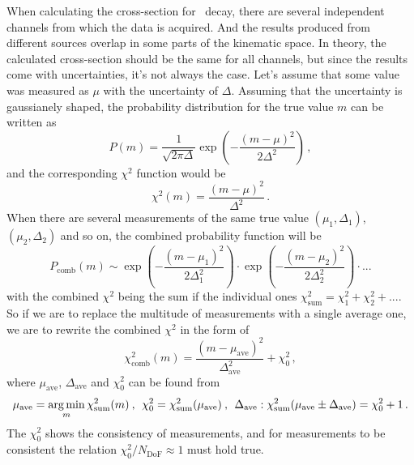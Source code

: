 When calculating the cross-section for \Zll\ decay, there are several independent channels from which the data is acquired. And the results produced from different sources overlap in some parts of the kinematic space. In theory, the calculated cross-section should be the same for all channels, but since the results come with uncertainties, it's not always the case. Let's assume that some value was measured as $\mu$ with the uncertainty of $\Delta$. Assuming that the uncertainty is gaussianely shaped, the probability distribution for the true value $m$ can be written as
\begin{equation}
P(m) = \frac{1}{\sqrt{2\pi\Delta}}\exp\left(-\frac{(m-\mu)^2}{2\Delta^2}\right) \,,
\end{equation}
and the corresponding $\chi^2$ function would be
\begin{equation}
\chi^2(m) = \frac{(m-\mu)^2}{\Delta^2} \,.
\end{equation}
When there are several measurements of the same true value $(\mu_1, \Delta_1)$, $(\mu_2, \Delta_2)$ and so on, the combined probability function will be
\begin{equation}
P_\mathrm{comb}(m) \sim \exp\left(-\frac{(m-\mu_1)^2}{2\Delta_1^2}\right) \cdot \exp\left(-\frac{(m-\mu_2)^2}{2\Delta_2^2}\right) \cdot ...
\end{equation}
with the combined $\chi^2$ being the sum if the individual ones $\chi^2_\mathrm{sum} = \chi^2_1 + \chi^2_2 + ...$. So if we are to replace the multitude of measurements with a single average one, we are to rewrite the combined $\chi^2$ in the form of
\begin{equation}
\chi^2_\mathrm{comb}(m) = \frac{(m-\mu_\mathrm{ave})^2}{\Delta_\mathrm{ave}^2} + \chi^2_0\,,
\end{equation}
where $\mu_\mathrm{ave}$, $\Delta_\mathrm{ave}$ and $\chi^2_0$ can be found from
\begin{equation}
\mu_\mathrm{ave} = \operatorname*{arg\,min}_m \chi^2_\mathrm{sum}(m) \:,\:\: \chi^2_0 = \chi^2_\mathrm{sum}(\mu_\mathrm{ave}) \:,\:\:\Delta_\mathrm{ave}: \chi^2_\mathrm{sum}(\mu_\mathrm{ave}\pm\Delta_\mathrm{ave})=\chi^2_0+1 \,.
\end{equation}
The $\chi^2_0$ shows the consistency of measurements, and for measurements to be consistent the relation $\chi^2_0 / N_\mathrm{DoF} \approx 1$ must hold true.

